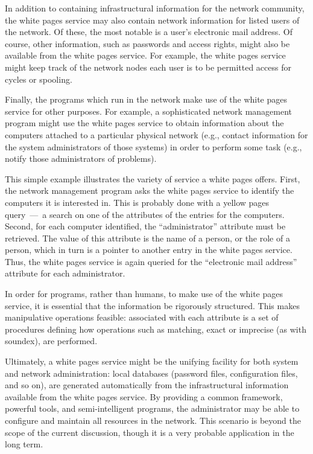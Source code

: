 In addition to containing infrastructural information for the
 network community,
the white pages service may also contain network information for 
 listed users of the network.
Of these,
the most notable is a user's electronic mail address.
Of course,
other information,
such as passwords and access rights,
might also be available from the white pages service.
For example,
the white pages service might keep track of the network nodes each user is to
be permitted access for cycles or spooling.

Finally,
the programs which run in the network make use of the white pages service for
other purposes.
For example,
a sophisticated network management program might use the white pages service
to obtain information about the computers attached to a particular physical
network
(e.g., contact information for the system administrators of those systems)
in order to perform some task
(e.g., notify those administrators of problems).

This simple example illustrates the variety of service a white pages offers.
First,
the network management program asks the white pages service to identify
the computers it is interested in.
This is probably done with a yellow pages query~---~a search on one of the
attributes of the entries for the computers.
Second,
for each computer identified,
the ``administrator'' attribute must be retrieved.
The value of this attribute is the name of a person, or the role of a person,
which in turn is a pointer to another entry in the white pages service.
Thus,
the white pages service is again queried for the ``electronic mail address''
attribute for each administrator.

In order for programs,
rather than humans,
to make use of the white pages service,
it is essential that the information be rigorously structured.
This makes manipulative operations feasible:
associated with each attribute is a set of procedures defining how operations
such as matching, exact or imprecise (as with soundex), are performed.

Ultimately,
a white pages service might be the unifying facility for both system and
network administration:
local databases (password files, configuration files, and so on),
are generated automatically from the infrastructural information available from
the white pages service. 
By providing a common framework, powerful tools, and semi-intelligent
programs,
the administrator may be able to configure and maintain all resources in the
network.
This scenario is beyond the scope of the current discussion,
though it is a very probable application in the long term.

